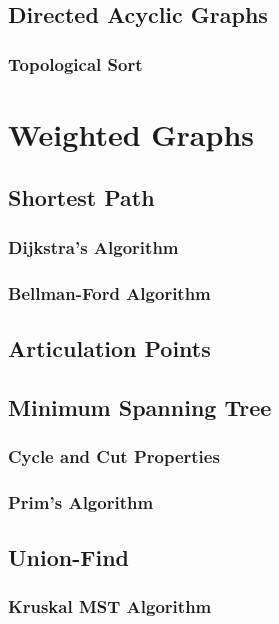 \documentclass{report}
\begin{document}
\section{Directed Acyclic Graphs}

\subsection{Topological Sort}


\chapter{Weighted Graphs}

\section{Shortest Path}

\subsection{Dijkstra's Algorithm}

\subsection{Bellman-Ford Algorithm}

\section{Articulation Points}

\section{Minimum Spanning Tree}

\subsection{Cycle and Cut Properties}

\subsection{Prim's Algorithm}

\section{Union-Find}

\subsection{Kruskal MST Algorithm}
\end{document}
